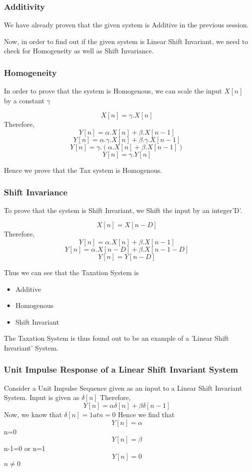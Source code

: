 \subsubsection{Additivity}
We have already proven that the given system is Additive in the previous session. 

Now, in order to find out if the given system is Linear Shift Invariant, we need to check for Homogeneity as well as Shift Invariance.

\subsubsection{Homogeneity}
In order to prove that the system is Homogenous, we can scale the input $X[n]$ by a constant $\gamma$

$$X[n] = \gamma.X[n]$$
Therefore, $$Y[n] = { \alpha.X[n] +\beta. X[n-1] }$$
$$Y[n] = { \alpha.\gamma.X[n] +\beta.\gamma. X[n-1] }$$
$$Y[n] = \gamma .({ \alpha.X[n] +\beta. X[n-1] })$$
$$Y[n] = \gamma.Y[n]$$

Hence we prove that the Tax system is Homogenous.

\subsubsection{Shift Invariance}
To prove that the system is Shift Invariant, we Shift the input by an integer'D'.

$$X[n] = X[n-D]$$
Therefore, $$Y[n] = { \alpha.X[n] +\beta. X[n-1] }$$
$$Y[n] = { \alpha.X[n-D] +\beta. X[n-1-D] }$$
$$Y[n] = Y[n-D]$$

Thus we can see that the Taxation System is
\begin{itemize}
\item Additive
\item Homogenous
\item Shift Invariant
\end{itemize}

The Taxation System is thus found out to be an example of a 'Linear Shift Invariant' System.

\begin{figure}
\centering
\end{figure}





\subsubsection{Unit Impulse Response of a Linear Shift Invariant System}
Consider a Unit Impulse Sequence given as an input to a Linear Shift Invariant System. 
Input is given as $\delta[n]$
Therefore, $$Y[n] = { \alpha\delta[n] +\beta \delta[n-1] }$$
Now, we know that $\delta[n]=1 at n=0$
Hence we find that
$$Y[n]=\alpha $$ n=0
$$Y[n]=\beta $$ n-1=0 or n=1
$$Y[n]=0 $$ $n \neq 0$


